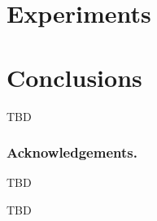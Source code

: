 \documentclass[russian,english]{llncs}
\begin{document}
\section{Experiments}
\label{sec:Experiments}

\section{Conclusions}
\label{sec:Conclusions}

TBD

\bigskip
\subsubsection*{Acknowledgements.}

TBD

%
%

\begin{thebibliography}{10}

TBD

\end{thebibliography}
\end{document}
